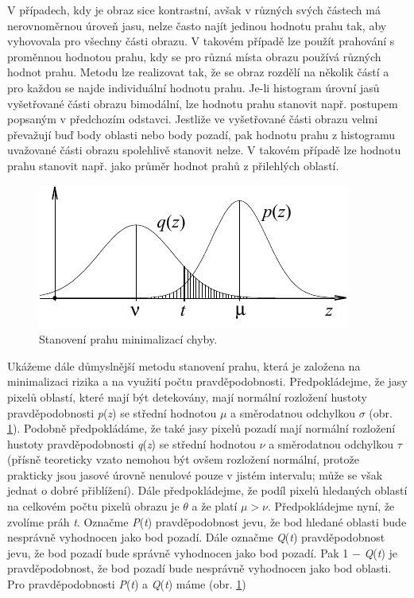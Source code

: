 V případech, kdy je obraz sice kontrastní, avšak v různých svých částech má nerovnoměrnou úroveň jasu, nelze často najít jedinou hodnotu prahu tak, aby vyhovovala pro všechny části obrazu. V takovém případě lze použít prahování s proměnnou hodnotou prahu, kdy se pro různá místa obrazu používá různých hodnot prahu. Metodu lze realizovat tak, že se obraz rozdělí na několik částí a pro každou se najde individuální hodnotu prahu. Je-li histogram úrovní jasů vyšetřované části obrazu bimodální, lze hodnotu prahu stanovit např. postupem popsaným v předchozím odstavci. Jestliže ve vyšetřované části obrazu velmi převažují buď body oblasti nebo body pozadí, pak hodnotu prahu z histogramu uvažované části obrazu spolehlivě stanovit nelze. V takovém případě lze hodnotu prahu stanovit např. jako průměr hodnot prahů z přilehlých oblastí.

\begin{figure}[th]
    \begin{center}
        \includegraphics[scale=0.9]{08_segmentace/images/img_8_23.pdf}
    \end{center}
    \caption{Stanovení prahu minimalizací chyby.}
    \label{img:8_23}
\end{figure}

Ukážeme dále důmyslnější metodu stanovení prahu, která je založena na minimalizaci rizika a na využití počtu pravděpodobnosti. Předpokládejme, že jasy pixelů oblastí, které mají být detekovány, mají normální rozložení hustoty pravděpodobnosti \textit{p}(\textit{z}) se střední hodnotou $\mu$ a směrodatnou odchylkou $\sigma$ (obr. \ref{img:8_23}). Podobně předpokládáme, že také jasy pixelů pozadí mají normální rozložení hustoty pravděpodobnosti \textit{q}(\textit{z}) se střední hodnotou $\nu$ a směrodatnou odchylkou $\tau$ (přísně teoreticky vzato nemohou být ovšem rozložení normální, protože prakticky jsou jasové úrovně nenulové pouze v jistém intervalu; může se však jednat o dobré přiblížení). Dále předpokládejme, že podíl pixelů hledaných oblastí na celkovém počtu pixelů obrazu je $\theta$ a že platí $\mu > \nu$. Předpokládejme nyní, že zvolíme práh \textit{t}. Označme \textit{P}(\textit{t}) pravděpodobnost jevu, že bod hledané oblasti bude nesprávně vyhodnocen jako bod pozadí. Dále označme \textit{Q}(\textit{t}) pravděpodobnost jevu, že bod pozadí bude správně vyhodnocen jako bod pozadí. Pak 1 $-$ \textit{Q}(\textit{t}) je pravděpodobnost, že bod pozadí bude nesprávně vyhodnocen jako bod oblasti. Pro pravděpodobnosti \textit{P}(\textit{t}) a \textit{Q}(\textit{t}) máme (obr. \ref{img:8_23})


